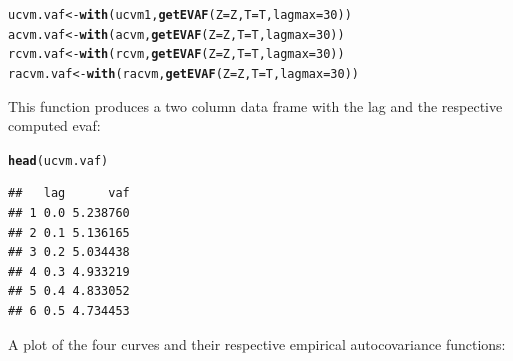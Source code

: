 \documentclass[10pt]{article}\usepackage[]{graphicx}\usepackage[]{color}
\makeatletter
\newcommand{\hlnum}[1]{\textcolor[rgb]{0.686,0.059,0.569}{#1}}%
\newcommand{\hlstd}[1]{\textcolor[rgb]{0.345,0.345,0.345}{#1}}%
\newcommand{\hlkwb}[1]{\textcolor[rgb]{0.69,0.353,0.396}{#1}}%
\newcommand{\hlkwc}[1]{\textcolor[rgb]{0.333,0.667,0.333}{#1}}%
\newcommand{\hlkwd}[1]{\textcolor[rgb]{0.737,0.353,0.396}{\textbf{#1}}}%
\newenvironment{kframe}{%
 \def\at@end@of@kframe{}%
 \ifinner\ifhmode%
  \def\at@end@of@kframe{\end{minipage}}%
  \begin{minipage}{\columnwidth}%
 \fi\fi%
 \def\FrameCommand##1{\hskip\@totalleftmargin \hskip-\fboxsep
 \colorbox{shadecolor}{##1}\hskip-\fboxsep
     \hskip-\linewidth \hskip-\@totalleftmargin \hskip\columnwidth}%
 \MakeFramed {\advance\hsize-\width
   \@totalleftmargin\z@ \linewidth\hsize
   \@setminipage}}%
 {\par\unskip\endMakeFramed%
 \at@end@of@kframe}
\newenvironment{knitrout}{}{} %
\makeatother
\begin{document}
\begin{knitrout}
\color{fgcolor}\begin{kframe}
\begin{alltt}
\hlstd{ucvm.vaf} \hlkwb{<-} \hlkwd{with}\hlstd{(ucvm1,} \hlkwd{getEVAF}\hlstd{(}\hlkwc{Z} \hlstd{= Z,} \hlkwc{T} \hlstd{= T,} \hlkwc{lagmax} \hlstd{=} \hlnum{30}\hlstd{))}
\hlstd{acvm.vaf} \hlkwb{<-} \hlkwd{with}\hlstd{(acvm,} \hlkwd{getEVAF}\hlstd{(}\hlkwc{Z} \hlstd{= Z,} \hlkwc{T} \hlstd{= T,} \hlkwc{lagmax} \hlstd{=} \hlnum{30}\hlstd{))}
\hlstd{rcvm.vaf} \hlkwb{<-} \hlkwd{with}\hlstd{(rcvm,} \hlkwd{getEVAF}\hlstd{(}\hlkwc{Z} \hlstd{= Z,} \hlkwc{T} \hlstd{= T,} \hlkwc{lagmax} \hlstd{=} \hlnum{30}\hlstd{))}
\hlstd{racvm.vaf} \hlkwb{<-} \hlkwd{with}\hlstd{(racvm,} \hlkwd{getEVAF}\hlstd{(}\hlkwc{Z} \hlstd{= Z,} \hlkwc{T} \hlstd{= T,} \hlkwc{lagmax} \hlstd{=} \hlnum{30}\hlstd{))}
\end{alltt}
\end{kframe}
\end{knitrout}

\noindent This function produces a two column data frame with the lag and the respective computed evaf:
\begin{knitrout}
\color{fgcolor}\begin{kframe}
\begin{alltt}
\hlkwd{head}\hlstd{(ucvm.vaf)}
\end{alltt}
\begin{verbatim}
##   lag      vaf
## 1 0.0 5.238760
## 2 0.1 5.136165
## 3 0.2 5.034438
## 4 0.3 4.933219
## 5 0.4 4.833052
## 6 0.5 4.734453
\end{verbatim}
\end{kframe}
\end{knitrout}

\noindent A plot of the four curves and their respective empirical autocovariance functions:
\end{document}
